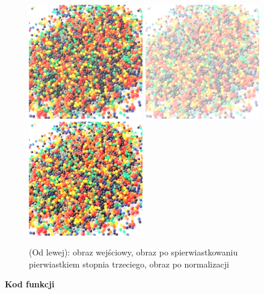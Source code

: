 \documentclass[magisterska,openany]{pracadypl}
\begin{document}
\begin{figure}[h]
\centering
\includegraphics[width=5cm, height=5cm]{orgi/RGBkulki.jpg}
\includegraphics[width=5cm, height=5cm]{4_9/rootRGB2.jpg}
\includegraphics[width=5cm, height=5cm]{4_9/nrootRGB2.jpg}
\caption{(Od lewej): obraz wejściowy, obraz po spierwiastkowaniu pierwiastkiem stopnia trzeciego, obraz po normalizacji}
\end{figure}

\newpage
\textbf{\Large Kod funkcji}
   
\end{document}

